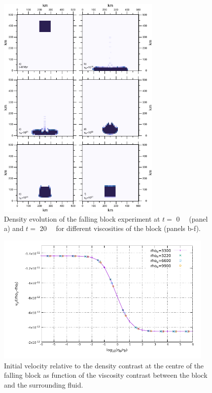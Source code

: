 \documentclass[hidelinks,10pt,a4paper]{article}
\begin{document}
\begin{figure}
\noindent\includegraphics[width=300px]{./Figures/Block.pdf}
\centering
\caption{Density evolution of the falling block experiment at $t=$ \SI{0}{\mega\year} (panel a) and $t=$ \SI{20}{\mega\year} for different viscosities of the
block (panels b-f).}
\label{fig:block}
\end{figure}

\begin{figure}
\centering
\noindent\includegraphics[width=400px]{./Figures/Falling.pdf}
\caption{Initial velocity relative to the density contrast at the centre of the falling block as function of the viscosity contrast between the block and the
surrounding fluid.}
\label{fig:falling}
\end{figure}
\end{document}
